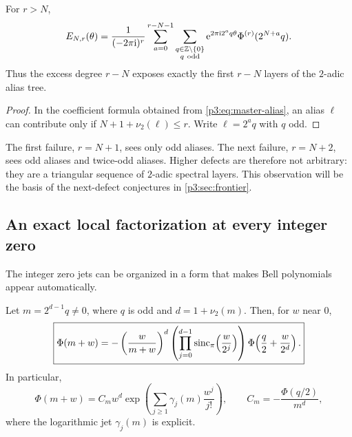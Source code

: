 \documentclass[11pt,oneside]{article}
\numberwithin{equation}{section}
\theoremstyle{definition}
\theoremstyle{remark}
\newcommand{\Z}{\mathbb Z}
\newcommand{\e}{\mathrm e}
\begin{document}
\begin{corollary}
\label{p3:cor:valuation-filtration}
For $r>N$,
\begin{equation}
 E_{N,r}(\theta)
 =\frac1{(-2\pi\iu)^r}
 \sum_{a=0}^{r-N-1}
 \sum_{\substack{q\in\Z\setminus\{0\}\\q\ \mathrm{odd}}}
 \e^{2\pi\iu 2^aq\theta}
 \Phi^{(r)}(2^{N+a}q).
 \label{p3:eq:valuation-filtration}
\end{equation}
Thus the excess degree $r-N$ exposes exactly the first $r-N$ layers of the $2$-adic alias tree.
\end{corollary}

\begin{proof}
In the coefficient formula obtained from \eqref{p3:eq:master-alias}, an alias $\ell$ can contribute only if
$N+1+\nu_2(\ell)\le r$.  Write $\ell=2^aq$ with $q$ odd.
\end{proof}

\begin{remark}
The first failure, $r=N+1$, sees only odd aliases.  The next failure, $r=N+2$, sees odd aliases and twice-odd aliases.  Higher defects are therefore not arbitrary: they are a triangular sequence of $2$-adic spectral layers.  This observation will be the basis of the next-defect conjectures in \cref{p3:sec:frontier}.
\end{remark}

\subsection{An exact local factorization at every integer zero}

The integer zero jets can be organized in a form that makes Bell polynomials appear automatically.

\begin{proposition}
\label{p3:prop:local-factorization}
Let $m=2^{d-1}q\ne0$, where $q$ is odd and $d=1+\nu_2(m)$.  Then, for $w$ near $0$,
\begin{equation}
 \boxed{\displaystyle
 \Phi(m+w)
 =-\left(\frac{w}{m+w}\right)^d
 \left(\prod_{j=0}^{d-1}\operatorname{sinc}_{\pi}\!\left(\frac{w}{2^j}\right)\right)
 \Phi\!\left(\frac q2+\frac{w}{2^d}\right).}
 \label{p3:eq:local-factorization}
\end{equation}
In particular,
\begin{equation}
 \Phi(m+w)=C_mw^d
 \exp\!\left(\sum_{j\ge1}\gamma_j(m)\frac{w^j}{j!}\right),
 \qquad
 C_m=-\frac{\Phi(q/2)}{m^d},
 \label{p3:eq:local-Bell-form}
\end{equation}
where the logarithmic jet $\gamma_j(m)$ is explicit.
\end{proposition}
\end{document}
